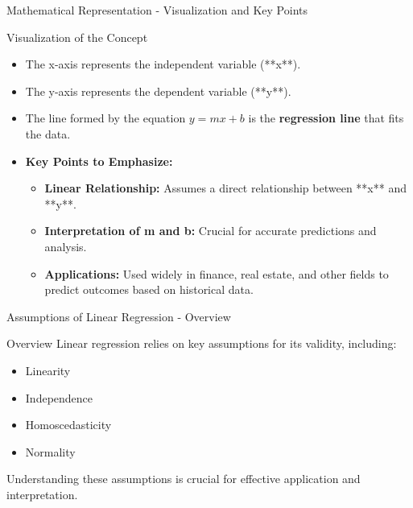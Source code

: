 \documentclass[aspectratio=169]{beamer}
\begin{document}
\begin{frame}[fragile]{Mathematical Representation - Visualization and Key Points}
    \begin{block}{Visualization of the Concept}
        \begin{itemize}
            \item The x-axis represents the independent variable (**x**).
            \item The y-axis represents the dependent variable (**y**).
            \item The line formed by the equation \(y = mx + b\) is the \textbf{regression line} that fits the data.
        \end{itemize}
    \end{block}

    \begin{itemize}
        \item \textbf{Key Points to Emphasize:}
            \begin{itemize}
                \item \textbf{Linear Relationship:} Assumes a direct relationship between **x** and **y**.
                \item \textbf{Interpretation of m and b:} Crucial for accurate predictions and analysis.
                \item \textbf{Applications:} Used widely in finance, real estate, and other fields to predict outcomes based on historical data.
            \end{itemize}
    \end{itemize}
\end{frame}

\begin{frame}[fragile]{Assumptions of Linear Regression - Overview}
    \begin{block}{Overview}
        Linear regression relies on key assumptions for its validity, including:
    \end{block}
    \begin{itemize}
        \item Linearity
        \item Independence
        \item Homoscedasticity
        \item Normality
    \end{itemize}
    Understanding these assumptions is crucial for effective application and interpretation.
\end{frame}
\end{document}
